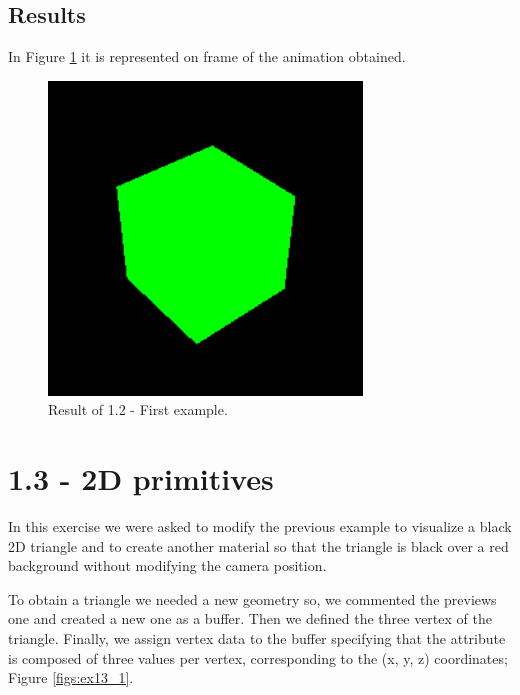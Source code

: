 \documentclass[12pt]{article}
\begin{document}
\clearpage
\subsection{Results}

In Figure \ref{figs:ex12_result} it is represented on frame of the animation obtained.

\begin{figure}[h!]
    \centering
        \includegraphics[width = \textwidth]{figs/ex12_result.png}
        \caption{Result of 1.2 - First example.}
        \label{figs:ex12_result}
\end{figure}

\section*{1.3 - 2D primitives}
\label{ex_13}

In this exercise we were asked to modify the previous example to visualize a black 2D triangle and to create another material so that the triangle is black over a red background without modifying the camera position.\par

To obtain a triangle we needed a new geometry so, we commented the previews one and created a new one as a buffer. Then we defined the three vertex of the triangle. Finally, we assign vertex data to the buffer specifying that the attribute is composed of three values per vertex, corresponding to the (x, y, z) coordinates; Figure \ref{figs:ex13_1}.
\end{document}
